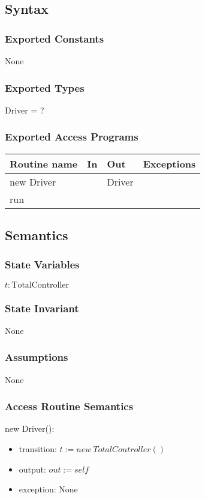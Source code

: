 \documentclass[12pt]{article}
\begin{document}
\subsection*{Syntax}
\subsubsection*{Exported Constants}
None
\subsubsection*{Exported Types}
Driver = ?
\subsubsection*{Exported Access Programs}
\begin{tabular}{| l | l | l | p{5cm} |}
\hline
\textbf{Routine name} & \textbf{In} & \textbf{Out} & \textbf{Exceptions}\\
\hline
new Driver &  & Driver & \\
\hline
run & &  & \\
\hline
\end{tabular}

\subsection*{Semantics}
\subsubsection*{State Variables}
$t : \text{TotalController}$
\subsubsection*{State Invariant}
None
\subsubsection*{Assumptions}
None
\subsubsection*{Access Routine Semantics}
\noindent new Driver():
\begin{itemize}
\item transition: $t := new\ TotalController()$
\item output: $out := \mathit{self}$
\item exception: None
\end{itemize}
\end{document}
